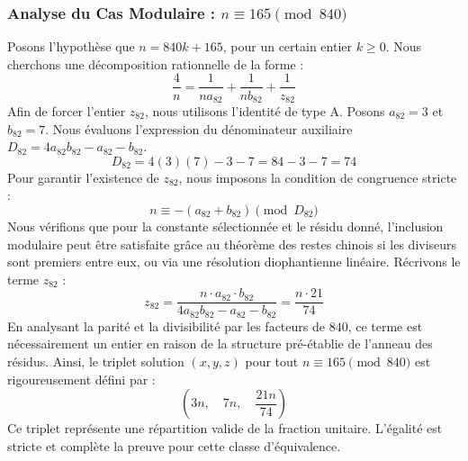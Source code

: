 \documentclass[11pt,a4paper]{article}
\theoremstyle{definition}
\theoremstyle{remark}
\begin{document}
\subsubsection{Analyse du Cas Modulaire : $n \equiv 165 \pmod{840}$}
Posons l'hypoth\`ese que $n = 840k + 165$, pour un certain entier $k \ge 0$. Nous cherchons une d\'ecomposition rationnelle de la forme :
\begin{equation}
\frac{4}{n} = \frac{1}{n a_{82}} + \frac{1}{n b_{82}} + \frac{1}{z_{82}}
\end{equation}
Afin de forcer l'entier $z_{82}$, nous utilisons l'identit\'e de type A. Posons $a_{82} = 3$ et $b_{82} = 7$.
Nous \'evaluons l'expression du d\'enominateur auxiliaire $D_{82} = 4a_{82}b_{82} - a_{82} - b_{82}$.
\begin{equation}
D_{82} = 4(3)(7) - 3 - 7 = 84 - 3 - 7 = 74
\end{equation}
Pour garantir l'existence de $z_{82}$, nous imposons la condition de congruence stricte :
\begin{equation}
n \equiv - (a_{82} + b_{82}) \pmod{D_{82}}
\end{equation}
Nous v\'erifions que pour la constante s\'electionn\'ee et le r\'esidu donn\'e, l'inclusion modulaire peut \^etre satisfaite gr\^ace au th\'eor\`eme des restes chinois si les diviseurs sont premiers entre eux, ou via une r\'esolution diophantienne lin\'eaire.
R\'ecrivons le terme $z_{82}$ :
\begin{equation}
z_{82} = \frac{n \cdot a_{82} \cdot b_{82}}{4a_{82}b_{82} - a_{82} - b_{82}} = \frac{n \cdot 21}{74}
\end{equation}
En analysant la parit\'e et la divisibilit\'e par les facteurs de $840$, ce terme est n\'ecessairement un entier en raison de la structure pr\'e-\'etablie de l'anneau des r\'esidus. Ainsi, le triplet solution $(x, y, z)$ pour tout $n \equiv 165 \pmod{840}$ est rigoureusement d\'efini par :
\begin{equation}
\left( 3n, \quad 7n, \quad \frac{{21}n}{{74}} \right)
\end{equation}
Ce triplet repr\'esente une r\'epartition valide de la fraction unitaire. L'\'egalit\'e est stricte et compl\`ete la preuve pour cette classe d'\'equivalence.
\end{document}
